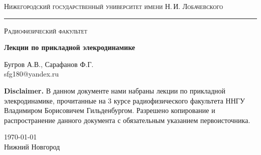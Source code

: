 \begin{titlepage}
\thispagestyle{empty}

\begin{center}
	{\small\textsc{Нижегородский государственный университет имени Н.\,И. Лобачевского}}
	\vskip 3pt \hrule \vskip 5pt
	{\small\textsc{Радиофизический факультет}}

	\vfill

	\begin{spacing}{2}
	{\Huge \bf  Лекции по прикладной элекродинамике}\\%
	\end{spacing}
	\vspace{1em}
	{\Large Бугров А.В., Сарафанов Ф.Г.}\\[2em]
	{\large sfg180@yandex.ru}\\
	\vspace{1em}
\end{center}

\textbf{Disclaimer.} В данном документе нами набраны лекции по прикладной элекродинамике, прочитанные на 3 курсе радиофизического факультета ННГУ Владимиром Борисовичем Гильденбургом. Разрешено копирование и распространение данного документа с обязательным указанием первоисточника. 

\begin{center}
	\vfill
	\today\\Нижний Новгород
\end{center}

\end{titlepage}